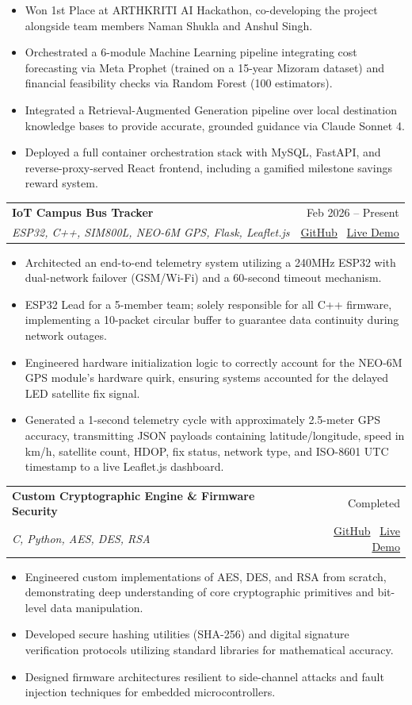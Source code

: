 \documentclass[11pt,letterpaper]{article}
\newcommand{\resumeProjectHeading}[4]{
\vspace{2pt}
\begin{tabularx}{\textwidth}{X r}
\textbf{#1} & #2 \\
\textit{#3} & #4
\end{tabularx}
\vspace{-3pt}
}
\newcommand{\resumeItem}[1]{
\item #1
}
\newcommand{\resumeItemListStart}{
\begin{itemize}[leftmargin=0.22in,itemsep=1pt,topsep=2pt]
}
\newcommand{\resumeItemListEnd}{
\end{itemize}
}
\begin{document}
\resumeItemListStart
\resumeItem{Won 1st Place at ARTHKRITI AI Hackathon, co-developing the project alongside team members Naman Shukla and Anshul Singh.}
\resumeItem{Orchestrated a 6-module Machine Learning pipeline integrating cost forecasting via Meta Prophet (trained on a 15-year Mizoram dataset) and financial feasibility checks via Random Forest (100 estimators).}
\resumeItem{Integrated a Retrieval-Augmented Generation pipeline over local destination knowledge bases to provide accurate, grounded guidance via Claude Sonnet 4.}
\resumeItem{Deployed a full container orchestration stack with MySQL, FastAPI, and reverse-proxy-served React frontend, including a gamified milestone savings reward system.}
\resumeItemListEnd

\vspace{4pt}

\resumeProjectHeading
{IoT Campus Bus Tracker}
{Feb 2026 -- Present}
{ESP32, C++, SIM800L, NEO-6M GPS, Flask, Leaflet.js}
{\href{https://github.com/your-github-link}{GitHub} \textbar\ \href{https://your-live-demo-link.com}{Live Demo}}

\resumeItemListStart
\resumeItem{Architected an end-to-end telemetry system utilizing a 240MHz ESP32 with dual-network failover (GSM/Wi-Fi) and a 60-second timeout mechanism.}
\resumeItem{ESP32 Lead for a 5-member team; solely responsible for all C++ firmware, implementing a 10-packet circular buffer to guarantee data continuity during network outages.}
\resumeItem{Engineered hardware initialization logic to correctly account for the NEO-6M GPS module's hardware quirk, ensuring systems accounted for the delayed LED satellite fix signal.}
\resumeItem{Generated a 1-second telemetry cycle with approximately 2.5-meter GPS accuracy, transmitting JSON payloads containing latitude/longitude, speed in km/h, satellite count, HDOP, fix status, network type, and ISO-8601 UTC timestamp to a live Leaflet.js dashboard.}
\resumeItemListEnd

\vspace{4pt}

\resumeProjectHeading
{Custom Cryptographic Engine \& Firmware Security}
{Completed}
{C, Python, AES, DES, RSA}
{\href{https://github.com/your-github-link}{GitHub} \textbar\ \href{https://your-live-demo-link.com}{Live Demo}}

\resumeItemListStart
\resumeItem{Engineered custom implementations of AES, DES, and RSA from scratch, demonstrating deep understanding of core cryptographic primitives and bit-level data manipulation.}
\resumeItem{Developed secure hashing utilities (SHA-256) and digital signature verification protocols utilizing standard libraries for mathematical accuracy.}
\resumeItem{Designed firmware architectures resilient to side-channel attacks and fault injection techniques for embedded microcontrollers.}
\resumeItemListEnd
\end{document}
